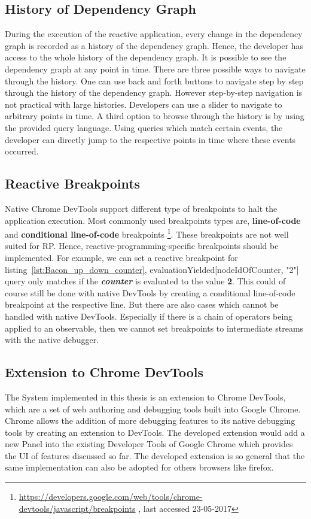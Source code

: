 \subsection{History of Dependency Graph}

During the execution of the reactive application, every change in the dependency graph is recorded as a history of the dependency graph. Hence, the developer has access to the whole history of the
dependency graph. It is possible to see the dependency graph at any point in time. There are three possible ways to navigate through the history. One can use back and forth buttons to navigate step by step through the history of the dependency graph. However step-by-step navigation is not practical with large histories. Developers can use a slider to navigate to arbitrary points in time. A third option to browse through the history is by using the provided query language. Using queries which match certain events, the developer can directly jump to the respective points in time where these events occurred.

\subsection{Reactive Breakpoints}
Native Chrome DevTools support different type of breakpoints to halt the application execution. Most commonly used breakpoints types are, \textbf{line-of-code} and \textbf{conditional line-of-code}
breakpoints \footnote{\url{https://developers.google.com/web/tools/chrome-devtools/javascript/breakpoints} , last accessed 23-05-2017}. These breakpoints are not well suited for RP. Hence, reactive-programming-specific breakpoints should be implemented.
For example, we can set a reactive breakpoint for listing~\ref{lst:Bacon_up_down_counter}, evaluationYielded[nodeIdOfCounter, "2"] query only matches if the \textbf{\textit{counter}} is evaluated to the value \textbf{2}.
This could of course still be done with native DevTools by creating a conditional line-of-code breakpoint at the respective line. But there are also cases which cannot be handled with native DevTools. 
Especially if there is a chain of operators being applied to an observable, then we cannot set breakpoints to intermediate streams with the native debugger.

\subsection{Extension to Chrome DevTools}
The System implemented in this thesis is an extension to Chrome DevTools, which are a set of web authoring and debugging tools built into Google Chrome. Chrome allows the addition of more debugging features to its native debugging tools by creating an extension to DevTools. The developed extension would add a new Panel into the existing Developer Tools of Google Chrome which provides the UI of features discussed so far. The developed extension is so general that the same implementation can also be adopted for others browsers like firefox.


